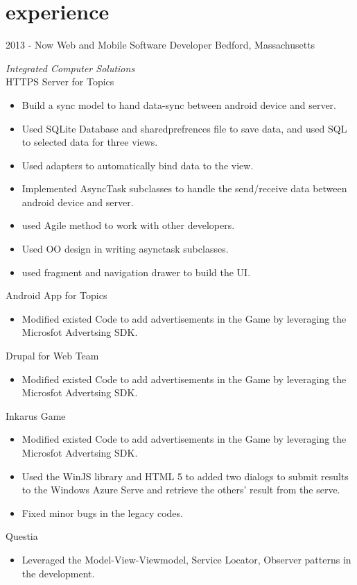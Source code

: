 \documentclass[]{ly-cv} %
\begin{document}
\section{experience}
\begin{entrylist}
\entry
{2013 - Now}
{Web and Mobile Software Developer}
{Bedford, Massachusetts}
{\emph{Integrated Computer Solutions}\\
HTTPS Server for Topics
\begin{itemize}
  \item Build a sync model to hand data-sync between android device and server.
  \item Used SQLite Database and sharedprefrences file to save data, and used SQL to selected data for three views. 
  \item Used adapters to automatically bind data to the view.
  \item Implemented AsyncTask subclasses to handle the send/receive data between android device and server.
  \item used Agile method to work with other developers.
  \item Used OO design in writing asynctask subclasses.
  \item used fragment and navigation drawer to build the UI.
\end{itemize}
Android App for Topics
\begin{itemize}
  \item Modified existed Code to add advertisements in the Game by leveraging the Microsfot Advertsing SDK.
\end{itemize}
Drupal for Web Team
\begin{itemize}
  \item Modified existed Code to add advertisements in the Game by leveraging the Microsfot Advertsing SDK.
\end{itemize}
Inkarus Game
\begin{itemize}
  \item Modified existed Code to add advertisements in the Game by leveraging the Microsfot Advertsing SDK.
  \item Used the WinJS library and HTML 5 to added two dialogs to submit results to the Windows Azure Serve and retrieve the others' result from the serve.
  \item Fixed minor bugs in the legacy codes.
\end{itemize}
Questia
\begin{itemize}
  \item Leveraged the Model-View-Viewmodel, Service Locator, Observer patterns in the development.

\end{itemize}}
\end{entrylist}
\end{document}
